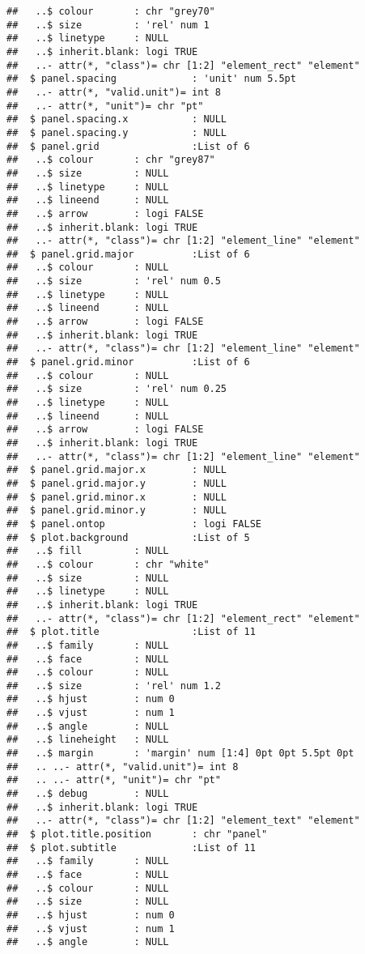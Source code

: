 \documentclass[]{article}
\begin{document}
\begin{verbatim}
##   ..$ colour       : chr "grey70"
##   ..$ size         : 'rel' num 1
##   ..$ linetype     : NULL
##   ..$ inherit.blank: logi TRUE
##   ..- attr(*, "class")= chr [1:2] "element_rect" "element"
##  $ panel.spacing             : 'unit' num 5.5pt
##   ..- attr(*, "valid.unit")= int 8
##   ..- attr(*, "unit")= chr "pt"
##  $ panel.spacing.x           : NULL
##  $ panel.spacing.y           : NULL
##  $ panel.grid                :List of 6
##   ..$ colour       : chr "grey87"
##   ..$ size         : NULL
##   ..$ linetype     : NULL
##   ..$ lineend      : NULL
##   ..$ arrow        : logi FALSE
##   ..$ inherit.blank: logi TRUE
##   ..- attr(*, "class")= chr [1:2] "element_line" "element"
##  $ panel.grid.major          :List of 6
##   ..$ colour       : NULL
##   ..$ size         : 'rel' num 0.5
##   ..$ linetype     : NULL
##   ..$ lineend      : NULL
##   ..$ arrow        : logi FALSE
##   ..$ inherit.blank: logi TRUE
##   ..- attr(*, "class")= chr [1:2] "element_line" "element"
##  $ panel.grid.minor          :List of 6
##   ..$ colour       : NULL
##   ..$ size         : 'rel' num 0.25
##   ..$ linetype     : NULL
##   ..$ lineend      : NULL
##   ..$ arrow        : logi FALSE
##   ..$ inherit.blank: logi TRUE
##   ..- attr(*, "class")= chr [1:2] "element_line" "element"
##  $ panel.grid.major.x        : NULL
##  $ panel.grid.major.y        : NULL
##  $ panel.grid.minor.x        : NULL
##  $ panel.grid.minor.y        : NULL
##  $ panel.ontop               : logi FALSE
##  $ plot.background           :List of 5
##   ..$ fill         : NULL
##   ..$ colour       : chr "white"
##   ..$ size         : NULL
##   ..$ linetype     : NULL
##   ..$ inherit.blank: logi TRUE
##   ..- attr(*, "class")= chr [1:2] "element_rect" "element"
##  $ plot.title                :List of 11
##   ..$ family       : NULL
##   ..$ face         : NULL
##   ..$ colour       : NULL
##   ..$ size         : 'rel' num 1.2
##   ..$ hjust        : num 0
##   ..$ vjust        : num 1
##   ..$ angle        : NULL
##   ..$ lineheight   : NULL
##   ..$ margin       : 'margin' num [1:4] 0pt 0pt 5.5pt 0pt
##   .. ..- attr(*, "valid.unit")= int 8
##   .. ..- attr(*, "unit")= chr "pt"
##   ..$ debug        : NULL
##   ..$ inherit.blank: logi TRUE
##   ..- attr(*, "class")= chr [1:2] "element_text" "element"
##  $ plot.title.position       : chr "panel"
##  $ plot.subtitle             :List of 11
##   ..$ family       : NULL
##   ..$ face         : NULL
##   ..$ colour       : NULL
##   ..$ size         : NULL
##   ..$ hjust        : num 0
##   ..$ vjust        : num 1
##   ..$ angle        : NULL

\end{verbatim}
\end{document}
